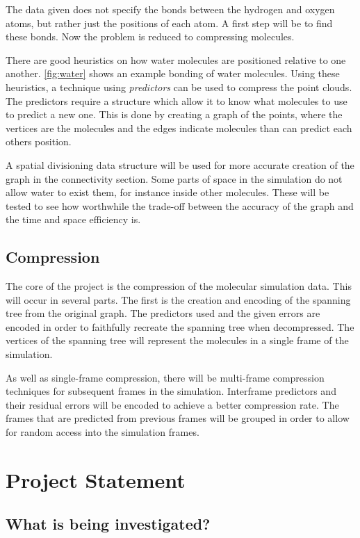 \documentclass[a4paper,twocolumn]{article}
\begin{document}
The data given does not specify the bonds between the hydrogen and oxygen
atoms, but rather just the positions of each atom. A first step will be to
find these bonds. Now the problem is reduced to compressing molecules.

There are good heuristics on how water molecules are positioned relative to
one another. \ref{fig:water} shows an example bonding of water molecules.
Using these heuristics, a technique using \emph{predictors} can
be used to compress the point clouds. The predictors require a structure which
allow it to know what molecules to use to predict a new one. This is done by
creating a graph of the points, where the vertices are the molecules and the
edges indicate molecules than can predict each others position.

A spatial divisioning data structure will be used for more accurate creation
of the graph in the connectivity section. Some parts of space in the
simulation do not allow water to exist them, for instance inside other
molecules. These will be tested to see how worthwhile the trade-off between
the accuracy of the graph and the time and space efficiency is.


\subsection{Compression}


The core of the project is the compression of the molecular simulation
data. This will occur in several parts. The first is the creation and encoding
of the spanning tree from the original graph. The predictors used and the
given errors are encoded in order to faithfully recreate the spanning tree
when decompressed. The vertices of the spanning tree will represent the
molecules in a single frame of the simulation.

As well as single-frame compression, there will be multi-frame compression
techniques for subsequent frames in the simulation. Interframe predictors and
their residual errors will be encoded to achieve a better compression
rate. The frames that are predicted from previous frames will be grouped in
order to allow for random access into the simulation frames.



\section{Project Statement}

\subsection{What is being investigated?}
\end{document}
